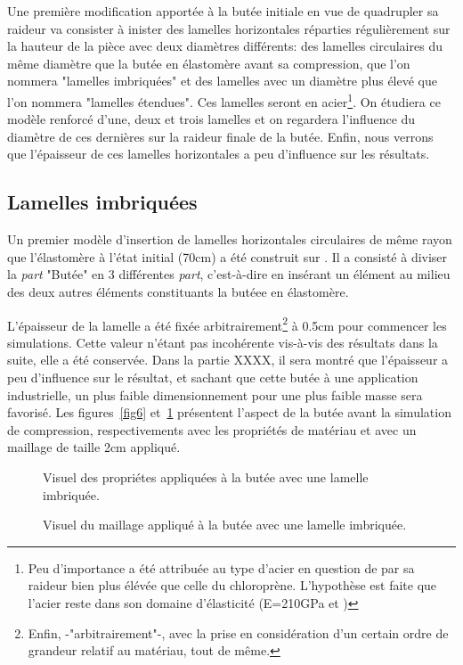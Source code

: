 ﻿\documentclass{article}
\newcommand{\abaqus}{\bsc{Abaqus}\xspace}
\begin{document}
Une première modification apportée à la butée initiale en vue de quadrupler sa raideur va consister à inister des lamelles horizontales réparties régulièrement sur la hauteur de la pièce avec deux diamètres différents: des lamelles circulaires du même diamètre que la butée en élastomère avant sa compression, que l'on nommera "lamelles imbriquées" et des lamelles avec un diamètre plus élevé que l'on nommera "lamelles étendues". Ces lamelles seront en acier\footnote{Peu d'importance a été attribuée au type d'acier en question de par sa raideur bien plus élévée que celle du chloroprène. L'hypothèse est faite que l'acier reste dans son domaine d'élasticité (E=210GPa et )}. On étudiera ce modèle renforcé d'une, deux et trois lamelles et on regardera l'influence du diamètre de ces dernières sur la raideur finale de la butée. Enfin, nous verrons que l'épaisseur de ces lamelles horizontales a peu d'influence sur les résultats.

\subsection{Lamelles imbriquées}

Un premier modèle d'insertion de lamelles horizontales circulaires de même rayon que l'élastomère à l'état initial (70cm) a été construit sur \abaqus. Il a consisté à diviser la \textit{part} "Butée" en 3 différentes \textit{part}, c'est-à-dire en insérant un élément au milieu des deux autres éléments constituants la butéee en élastomère.

L'épaisseur de la lamelle a été fixée arbitrairement\footnote{Enfin, -"arbitrairement"-, avec la prise en considération d'un certain ordre de grandeur relatif au matériau, tout de même.} à 0.5cm pour commencer les simulations. Cette valeur n'étant pas incohérente vis-à-vis des résultats dans la suite, elle a été conservée. Dans la partie XXXX, il sera montré que l'épaisseur a peu d'influence sur le résultat, et sachant que cette butée à une application industrielle, un plus faible dimensionnement pour une plus faible masse sera favorisé. 
Les figures~\ref{fig6} et~\ref{fig7} présentent l'aspect de la butée avant la simulation de compression, respectivements avec les propriétés de matériau et avec un maillage de taille 2cm appliqué.

\begin{figure}[htbp]
	\begin{minipage}[c]{.45\linewidth}
	\begin{center}
	\caption{Visuel des propriétes appliquées à la butée avec une lamelle imbriquée.}
	\label{fig6}
	\end{center}
	\end{minipage}
	\hfill
	\begin{minipage}[c]{.45\linewidth}
	\begin{center}
	\caption{Visuel du maillage appliqué à la butée avec une lamelle imbriquée.}
	\label{fig7}
	\end{center}
	\end{minipage}
\end{figure}
\end{document}
